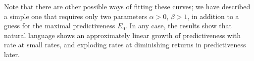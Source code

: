\documentclass[entropy,article,submit,moreauthors,pdftex,10pt,a4paper]{Definitions/mdpi}
\newcommand{\past}{\overleftarrow{X}}
\let\oldequation\equation
\let\oldendequation\endequation
\renewenvironment{equation}
  {\linenomathNonumbers\oldequation}
  {\oldendequation\endlinenomath}
\begin{document}
Note that there are other possible ways of fitting these curves; we have described a simple one that requires only two parameters $\alpha >0$, $\beta > 1$, in addition to a guess for the maximal predictiveness $E_0$.
In any case, the results show that natural language shows an approximately linear growth of predictiveness with rate at small rates, and exploding rates at diminishing returns in predictiveness later.



\end{document}

